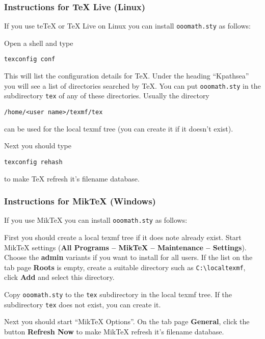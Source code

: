 \documentclass{article}
\newcommand\textstyleSourceText[1]{\texttt{\textmd{#1}}}
\begin{document}
\subsubsection{Instructions for TeX Live (Linux)}
{\mdseries
If you use teTeX or TeX Live on Linux you can install \textstyleSourceText{ooomath.sty} as follows:}

{\mdseries
Open a shell and type}

\begin{verbatim}
texconfig conf
\end{verbatim}
{\mdseries
This will list the configuration details for TeX. Under the heading ``Kpathsea'' you will see a list of directories searched by TeX. You can put \textstyleSourceText{ooomath.sty} in the subdirectory \textstyleSourceText{tex} of any of these directories. Usually the directory}

\begin{verbatim}
/home/<user name>/texmf/tex
\end{verbatim}
{\mdseries
can be used for the local texmf tree (you can create it if it doesn't exist).}

{\mdseries
Next you should type}

\begin{verbatim}
texconfig rehash
\end{verbatim}
{\mdseries
to make TeX refresh it's filename database.}

\subsubsection{Instructions for MikTeX (Windows)}
If you use MikTeX you can install \textstyleSourceText{ooomath.sty} as follows:

First you should create a local texmf tree if it does note already exist. Start MikTeX settings (\textbf{All Programs -- MikTeX -- Maintenance -- Settings}). Choose the \textbf{admin} variants if you want to install for all users. If the list on the tab page \textbf{Roots} is empty, create a suitable directory such as \textstyleSourceText{C:{\textbackslash}localtexmf}, click \textbf{Add} and select this directory.

Copy \textstyleSourceText{ooomath.sty} to the \textstyleSourceText{tex} subdirectory in the local texmf tree. If the subdirectory \textstyleSourceText{tex} does not exist, you can create it.

{\mdseries
Next you should start ``MikTeX Options''. On the tab page \textbf{General}, click the button \textbf{Refresh Now} to make MikTeX refresh it's filename database.}
\end{document}
